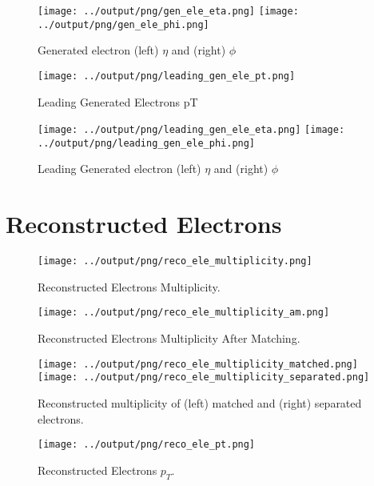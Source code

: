 \documentclass[11pt]{book}
\begin{document}
\begin{figure}[htb]
\centering
\texttt{[image: ../output/png/gen\_ele\_eta.png]}
\texttt{[image: ../output/png/gen\_ele\_phi.png]}
\caption{Generated electron (left) $\eta$ and (right) $\phi$}
\label{fig:gen_ele_eta_phi}
\end{figure}

\begin{figure}[htb]
\centering
\texttt{[image: ../output/png/leading\_gen\_ele\_pt.png]}
\caption{Leading Generated Electrons pT}
\label{fig:leading_gen_ele_pt}
\end{figure}

\begin{figure}[htb]
\centering
\texttt{[image: ../output/png/leading\_gen\_ele\_eta.png]}
\texttt{[image: ../output/png/leading\_gen\_ele\_phi.png]}
\caption{Leading Generated electron (left) $\eta$ and (right) $\phi$}
\label{fig:leading_gen_ele_eta_phi}
\end{figure}
\clearpage

\section{Reconstructed Electrons}

\begin{figure}[htb]
\centering
\texttt{[image: ../output/png/reco\_ele\_multiplicity.png]}
\caption{Reconstructed Electrons Multiplicity.}
\label{fig:reco_ele_multiplicity}
\end{figure}

\begin{figure}[htb]
\centering
\texttt{[image: ../output/png/reco\_ele\_multiplicity\_am.png]}
\caption{Reconstructed Electrons Multiplicity After Matching.}
\label{fig:reco_ele_multiplicity_am}
\end{figure}

\begin{figure}[htb]
\centering
\texttt{[image: ../output/png/reco\_ele\_multiplicity\_matched.png]}
\texttt{[image: ../output/png/reco\_ele\_multiplicity\_separated.png]}
\caption{Reconstructed multiplicity of (left) matched and (right) separated electrons.}
\label{fig:reco_ele_mat_sep}
\end{figure}

\begin{figure}[htb]
\centering
\texttt{[image: ../output/png/reco\_ele\_pt.png]}
\caption{Reconstructed Electrons $p_{T}$.}
\label{fig:reco_ele_pt}
\end{figure}
\end{document}
